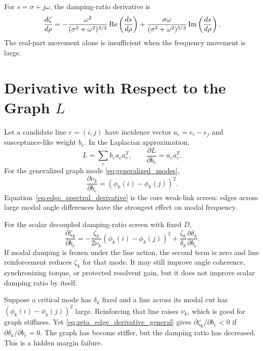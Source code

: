 For \(s=\sigma+j\omega\), the damping-ratio derivative is
\begin{equation}
  \frac{d\zeta}{d\rho}
  =
  -\frac{\omega^2}{(\sigma^2+\omega^2)^{3/2}}
  \operatorname{Re}\left(\frac{ds}{d\rho}\right)
  +
  \frac{\sigma\omega}{(\sigma^2+\omega^2)^{3/2}}
  \operatorname{Im}\left(\frac{ds}{d\rho}\right).
  \label{eq:fixed_zeta_sensitivity}
\end{equation}
The real-part movement alone is insufficient when the frequency movement is
large.

\section{Derivative with Respect to the Graph \texorpdfstring{\(L\)}{L}}

Let a candidate line \(e=(i,j)\) have incidence vector \(a_e=e_i-e_j\) and
susceptance-like weight \(b_e\). In the Laplacian approximation,
\begin{equation}
  L=\sum_{e} b_e a_ea_e^T,\qquad
  \frac{\partial L}{\partial b_e}=a_ea_e^T.
  \label{eq:laplacian_edge_sum}
\end{equation}
For the generalized graph mode \eqref{eq:generalized_modes},
\begin{equation}
  \frac{\partial \nu_k}{\partial b_e}
  =
  (\phi_k(i)-\phi_k(j))^2.
  \label{eq:edge_spectral_derivative}
\end{equation}
Equation~\eqref{eq:edge_spectral_derivative} is the core weak-link screen:
edges across large modal angle differences have the strongest effect on modal
frequency.

For the scalar decoupled damping-ratio screen with fixed \(D\),
\begin{equation}
  \frac{\partial \zeta_k}{\partial b_e}
  =
  -\frac{\zeta_k}{2\nu_k}
  (\phi_k(i)-\phi_k(j))^2
  +
  \frac{\zeta_k}{\delta_k}
  \frac{\partial \delta_k}{\partial b_e}.
  \label{eq:zeta_edge_derivative_general}
\end{equation}
If modal damping is frozen under the line action, the second term is zero and
line reinforcement reduces \(\zeta_k\) for that mode. It may still improve
angle coherence, synchronizing torque, or protected resolvent gain, but it does
not improve scalar damping ratio by itself.

\begin{example}
Suppose a critical mode has \(\delta_k\) fixed and a line across its modal cut
has \((\phi_k(i)-\phi_k(j))^2\) large. Reinforcing that line raises
\(\nu_k\), which is good for graph stiffness. Yet
\eqref{eq:zeta_edge_derivative_general} gives
\(\partial\zeta_k/\partial b_e<0\) if \(\partial\delta_k/\partial b_e=0\).
The graph has become stiffer, but the damping ratio has decreased. This is a
hidden margin failure.
\end{example}

